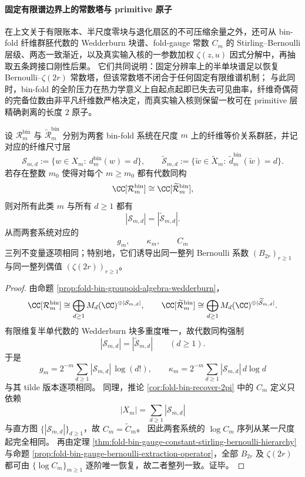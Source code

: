 \paragraph{固定有限谱边界上的常数塔与 primitive 原子}\label{par:gut-finite-spectral-boundary-primitive-atom}
在上文关于有限账本、半尺度零块与退化扇区的不可压缩余量之外，还可从 bin-fold 纤维群胚代数的 Wedderburn 块谱、fold-gauge 常数 \(C_m\) 的 Stirling--Bernoulli 层级、两态一致渐近，以及真实输入核的一参数加权 \(\zeta(z,u)\) 因式分解中，再抽取五条跨接口刚性后果。
它们共同说明：固定分辨率上的半单块谱足以恢复 Bernoulli--\(\zeta(2r)\) 常数塔，但该常数塔不闭合于任何固定有限维谱机制；
与此同时，bin-fold 的全阶压力在热力学意义上自起点起即已失去可见曲率，纤维奇偶荷的完备位数由非平凡纤维数严格决定，而真实输入核则保留一枚可在 primitive 层精确剥离的长度 \(2\) 原子。

\begin{theorem}\label{thm:gut-wedderburn-spectrum-determines-bernoulli-zeta-tower}
设 \(\mathcal R_m^{\mathrm{bin}}\) 与 \(\widetilde{\mathcal R}_m^{\mathrm{bin}}\) 分别为两套 bin-fold 系统在尺度 \(m\) 上的纤维等价关系群胚，并记对应的纤维尺寸层
\[
\mathcal S_{m,d}:=\{w\in X_m:\ d_m^{\mathrm{bin}}(w)=d\},
\qquad
\widetilde{\mathcal S}_{m,d}:=\{\widetilde w\in \widetilde X_m:\ \widetilde d_m^{\mathrm{bin}}(\widetilde w)=d\}.
\]
若存在整数 \(m_0\) 使得对每个 \(m\ge m_0\) 都有代数同构
\[
\CC[\mathcal R_m^{\mathrm{bin}}]\cong \CC[\widetilde{\mathcal R}_m^{\mathrm{bin}}],
\]
则对所有此类 \(m\) 与所有 \(d\ge 1\) 都有
\[
|\mathcal S_{m,d}|=|\widetilde{\mathcal S}_{m,d}|.
\]
从而两套系统对应的
\[
g_m,\qquad \kappa_m,\qquad C_m
\]
三列不变量逐项相同；特别地，它们诱导出同一整列 Bernoulli 系数 \((B_{2r})_{r\ge 1}\) 与同一整列偶值 \((\zeta(2r))_{r\ge 1}\)。
\end{theorem}
\begin{proof}
由命题 \ref{prop:fold-bin-groupoid-algebra-wedderburn}，
\[
\CC[\mathcal R_m^{\mathrm{bin}}]
\cong
\bigoplus_{d\ge 1} M_d(\CC)^{\oplus |\mathcal S_{m,d}|},
\qquad
\CC[\widetilde{\mathcal R}_m^{\mathrm{bin}}]
\cong
\bigoplus_{d\ge 1} M_d(\CC)^{\oplus |\widetilde{\mathcal S}_{m,d}|}.
\]
有限维复半单代数的 Wedderburn 块多重度唯一，故代数同构强制
\[
|\mathcal S_{m,d}|=|\widetilde{\mathcal S}_{m,d}|
\qquad(d\ge 1).
\]
于是
\[
g_m=2^{-m}\sum_{d\ge 1} |\mathcal S_{m,d}|\,\log(d!),
\qquad
\kappa_m=2^{-m}\sum_{d\ge 1} |\mathcal S_{m,d}|\,d\log d
\]
与其 tilde 版本逐项相同。
同理，推论 \ref{cor:fold-bin-recover-2pi} 中的 \(C_m\) 定义只依赖
\[
|X_m|=\sum_{d\ge 1} |\mathcal S_{m,d}|
\]
与直方图 \(\{|\mathcal S_{m,d}|\}_{d\ge 1}\)，故 \(C_m=\widetilde C_m\)。
因此两套系统的 \(\log C_m\) 序列从某一尺度起完全相同。
再由定理 \ref{thm:fold-bin-gauge-constant-stirling-bernoulli-hierarchy} 与命题 \ref{prop:fold-bin-gauge-bernoulli-extraction-operator}，全部 \(B_{2r}\) 及 \(\zeta(2r)\) 都可由 \(\{\log C_m\}_{m\ge 1}\) 逐阶唯一恢复，故二者整列一致。证毕。
\end{proof}

